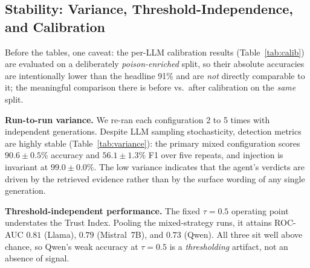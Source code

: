 \begin{table}[!ht]
\caption{$2\times2$ LLM\,$\times$\,embedding grid (TruthfulQA, 100 samples,
mixed, $K{=}3$).}
\label{tab:grid}
\centering {}
\end{table}

\subsection{Stability: Variance, Threshold-Independence, and Calibration}
\label{sec:stability}
Before the tables, one caveat: the per-LLM calibration results (Table~\ref{tab:calib}) are evaluated on a deliberately \emph{poison-enriched} split, so their absolute accuracies are intentionally lower than the headline 91\% and are \emph{not} directly comparable to it; the meaningful comparison there is before vs.\ after calibration on the \emph{same} split.

\textbf{Run-to-run variance.} We re-ran each configuration 2 to 5 times with independent generations. Despite LLM sampling stochasticity, detection metrics are highly stable (Table~\ref{tab:variance}): the primary mixed configuration scores $90.6{\pm}0.5\%$ accuracy and $56.1{\pm}1.3\%$ F1 over five repeats, and injection is invariant at $99.0{\pm}0.0\%$. The low variance indicates that the agent's verdicts are driven by the retrieved evidence rather than by the surface wording of any single generation.


\textbf{Threshold-independent performance.} The fixed $\tau{=}0.5$ operating point understates the Trust Index. Pooling the mixed-strategy runs, it attains ROC-AUC $0.81$ (Llama), $0.79$ (Mistral~7B), and $0.73$ (Qwen). All three sit well above chance, so Qwen's weak accuracy at $\tau{=}0.5$ is a \emph{thresholding} artifact, not an absence of signal.

